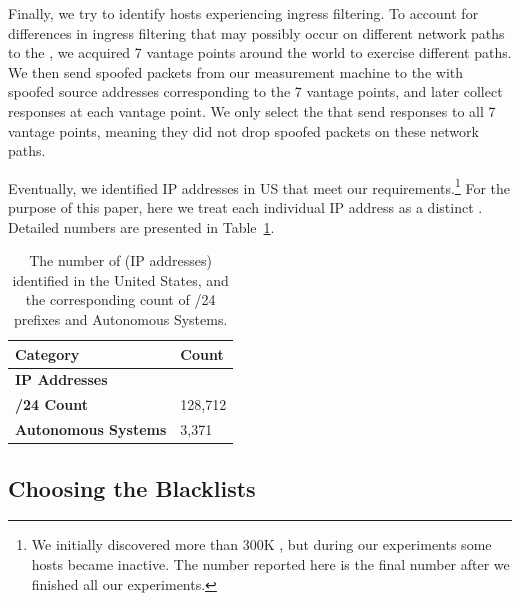 Finally, we try to identify hosts experiencing ingress filtering. To
account for differences in ingress filtering that may possibly occur on
different network paths to the {}, we acquired 7 vantage points around
the world to exercise different paths. %
We then send spoofed packets from our measurement
machine to the {} with spoofed source addresses corresponding to
the 7 vantage points, and later collect responses at each vantage point.
We only select the {} that send responses to all 7
vantage points, meaning they did not drop spoofed packets on these network paths.

Eventually, we identified {} IP addresses in US that meet our
requirements.\footnote{We
initially discovered more than 300K {}, but during our
experiments some hosts became inactive. The number reported here is the
final number after we finished all our experiments.} For the purpose of this paper, here we treat each individual IP
address as a distinct {}. Detailed numbers are presented in
Table~\ref{tab:target-hosts}.

\begin{table}[t]
\centering
\small
\begin{tabular}{l >{\hfill}p{4.5cm}}
 \toprule
 Category                    &  Count    \\
 \midrule
 \textbf{IP Addresses}       &    \\
 \textbf{/24 Count}          &  128,712  \\
 \textbf{Autonomous Systems} &  3,371    \\
 \bottomrule
\end{tabular}
\caption{The number of {} (IP addresses) identified in the United States, and the
corresponding count of /24 prefixes and Autonomous Systems.}
\label{tab:target-hosts}
\end{table}

\subsection{Choosing the Blacklists}
\label{sec:methblkl}

